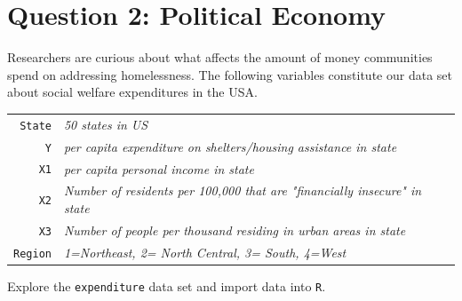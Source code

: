 \documentclass[12pt,letterpaper]{article}
\begin{document}
\newpage

	\section*{Question 2: Political Economy}

\noindent Researchers are curious about what affects the amount of money communities spend on addressing homelessness. The following variables constitute our data set about social welfare expenditures in the USA. \\
\vspace{.5cm}


\begin{tabular}{r|l}
	\texttt{State} &\emph{50 states in US} \\
	\texttt{Y} & \emph{per capita expenditure on shelters/housing assistance in state}\\
	\texttt{X1} &\emph{per capita personal income in state} \\
	\texttt{X2} &  \emph{Number of residents per 100,000 that are "financially insecure" in state}\\
	\texttt{X3} &  \emph{Number of people per thousand residing in urban areas in state} \\
	\texttt{Region} &  \emph{1=Northeast, 2= North Central, 3= South, 4=West} \\
\end{tabular}

\vspace{.5cm}
\noindent Explore the \texttt{expenditure} data set and import data into \texttt{R}.

  
\end{document}
